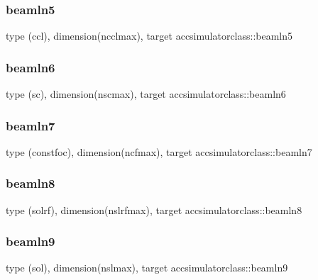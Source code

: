 \subsubsection{\texorpdfstring{beamln5}{beamln5}}
{\footnotesize\ttfamily type (ccl), dimension(ncclmax), target accsimulatorclass\+::beamln5}

\mbox{\label{namespaceaccsimulatorclass_aecb8568d8a048be9dd3f8ebf18c48e72}} 
\subsubsection{\texorpdfstring{beamln6}{beamln6}}
{\footnotesize\ttfamily type (sc), dimension(nscmax), target accsimulatorclass\+::beamln6}

\mbox{\label{namespaceaccsimulatorclass_aee9caad06453a0e66c229bf239519041}} 
\subsubsection{\texorpdfstring{beamln7}{beamln7}}
{\footnotesize\ttfamily type (constfoc), dimension(ncfmax), target accsimulatorclass\+::beamln7}

\mbox{\label{namespaceaccsimulatorclass_a85003b545c7adc9e597e5fd6be9828c5}} 
\subsubsection{\texorpdfstring{beamln8}{beamln8}}
{\footnotesize\ttfamily type (solrf), dimension(nslrfmax), target accsimulatorclass\+::beamln8}

\mbox{\label{namespaceaccsimulatorclass_a7685c672080dfc1af30f91257a832844}} 
\subsubsection{\texorpdfstring{beamln9}{beamln9}}
{\footnotesize\ttfamily type (sol), dimension(nslmax), target accsimulatorclass\+::beamln9}

